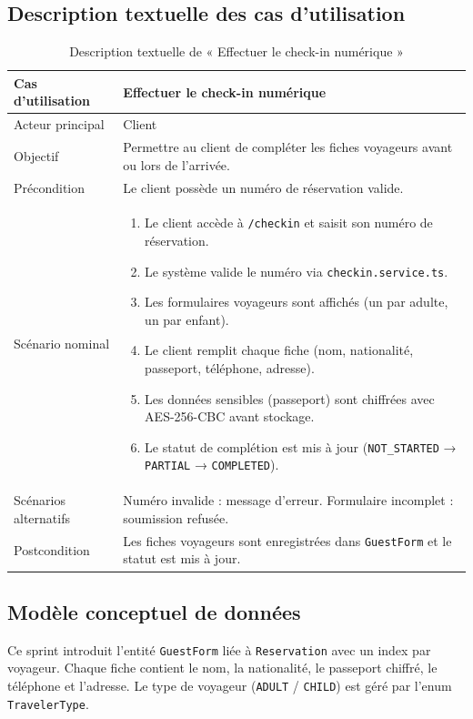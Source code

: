 \subsection{Description textuelle des cas d'utilisation}

\begin{table}[H]
\centering
\caption{Description textuelle de « Effectuer le check-in numérique »}
\small
\begin{tabularx}{\textwidth}{|p{3.5cm}|X|}
\hline
Cas d'utilisation & Effectuer le check-in numérique \\ \hline
Acteur principal & Client \\ \hline
Objectif & Permettre au client de compléter les fiches voyageurs avant ou lors de l'arrivée. \\ \hline
Précondition & Le client possède un numéro de réservation valide. \\ \hline
Scénario nominal &
\begin{enumerate}[nosep]
\item Le client accède à \texttt{/checkin} et saisit son numéro de réservation.
\item Le système valide le numéro via \texttt{checkin.service.ts}.
\item Les formulaires voyageurs sont affichés (un par adulte, un par enfant).
\item Le client remplit chaque fiche (nom, nationalité, passeport, téléphone, adresse).
\item Les données sensibles (passeport) sont chiffrées avec AES-256-CBC avant stockage.
\item Le statut de complétion est mis à jour (\texttt{NOT\_STARTED} → \texttt{PARTIAL} → \texttt{COMPLETED}).
\end{enumerate} \\ \hline
Scénarios alternatifs & Numéro invalide : message d'erreur. Formulaire incomplet : soumission refusée. \\ \hline
Postcondition & Les fiches voyageurs sont enregistrées dans \texttt{GuestForm} et le statut est mis à jour. \\ \hline
\end{tabularx}
\end{table}

\subsection{Modèle conceptuel de données}
Ce sprint introduit l'entité \texttt{GuestForm} liée à \texttt{Reservation} avec un index par voyageur. Chaque fiche contient le nom, la nationalité, le passeport chiffré, le téléphone et l'adresse. Le type de voyageur (\texttt{ADULT} / \texttt{CHILD}) est géré par l'enum \texttt{TravelerType}.

